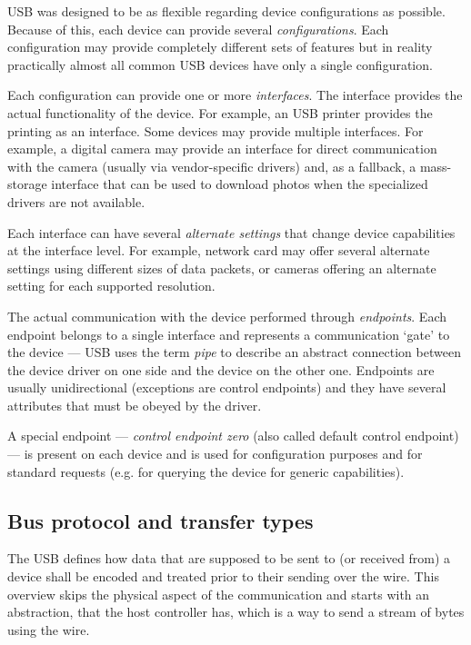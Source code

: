 USB was designed to be as flexible regarding device configurations as possible.
Because of this, each device can provide several \textit{configurations}. Each
configuration may provide completely different sets of features but in reality
practically almost all common USB devices have only a single configuration.

Each configuration can provide one or more \textit{interfaces}. The interface
provides the actual functionality of the device. For example, an USB printer
provides the printing as an interface. Some devices may provide multiple
interfaces. For example, a digital camera may provide an interface for direct
communication with the camera (usually via vendor-specific drivers) and, as a
fallback, a mass-storage interface that can be used to download photos when the
specialized drivers are not available.

Each interface can have several \textit{alternate settings} that change device
capabilities at the interface level. For example, network card may offer
several alternate settings using different sizes of data packets, or cameras
offering an alternate setting for each supported resolution.

The actual communication with the device performed through \textit{endpoints}.
Each endpoint belongs to a single interface and represents a communication
‘gate’ to the device — USB uses the term \textit{pipe} to describe an abstract
connection between the device driver on one side and the device on the other
one. Endpoints are usually unidirectional (exceptions are control endpoints)
and they have several attributes that must be obeyed by the driver.

A special endpoint — \textit{control endpoint zero} (also called default
control endpoint) — is present on each device and is used for configuration
purposes and for standard requests (e.g. for querying the device for
generic capabilities).

\subsection{Bus protocol and transfer types}

The USB defines how data that are supposed to be sent to (or received from) a
device shall be encoded and treated prior to their sending over the wire. This
overview skips the physical aspect of the communication and starts with an
abstraction, that the host controller has, which is a way to send a stream of
bytes using the wire.

